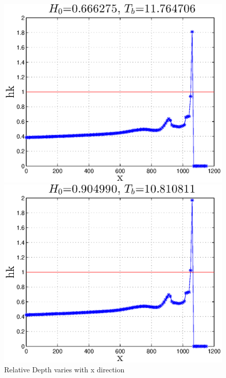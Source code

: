 

\begin{figure}[H]
\label{Fighk_1}
\begin{minipage}[b]{0.47\linewidth}
\centering
\includegraphics[width=\textwidth]{forward_plot/p1_2.eps}
\end{minipage}
\hspace{0.2cm}
\begin{minipage}[b]{0.47\linewidth}
\centering
\includegraphics[width=\textwidth]{forward_plot/p2_2.eps}
\end{minipage}
\caption{Relative Depth varies with x direction}
\end{figure}

